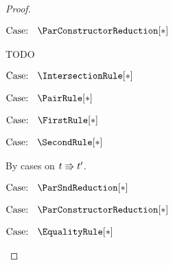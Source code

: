 \begin{proof}
\begin{proofcase}
        $\text{Case: }\begin{array}{c} \ParConstructorReduction[*] \end{array}$
        \begin{proofcase}
            TODO
        \end{proofcase}
    \end{proofcase}

    $\text{Case: }\begin{array}{c} \IntersectionRule[*] \end{array}$
    \begin{proofcase}
    \end{proofcase}

    $\text{Case: }\begin{array}{c} \PairRule[*] \end{array}$
    \begin{proofcase}
    \end{proofcase}

    $\text{Case: }\begin{array}{c} \FirstRule[*] \end{array}$
    \begin{proofcase}
    \end{proofcase}

    $\text{Case: }\begin{array}{c} \SecondRule[*] \end{array}$
    \begin{proofcase}
        By cases on $t \Rrightarrow t^\prime$.

        $\text{Case: }\begin{array}{c} \ParSndReduction[*] \end{array}$
        \begin{proofcase}


        \end{proofcase}

        $\text{Case: }\begin{array}{c} \ParConstructorReduction[*] \end{array}$
        \begin{proofcase}
        \end{proofcase}
    \end{proofcase}

    $\text{Case: }\begin{array}{c} \EqualityRule[*] \end{array}$
    \begin{proofcase}
    \end{proofcase}


\end{proof}
